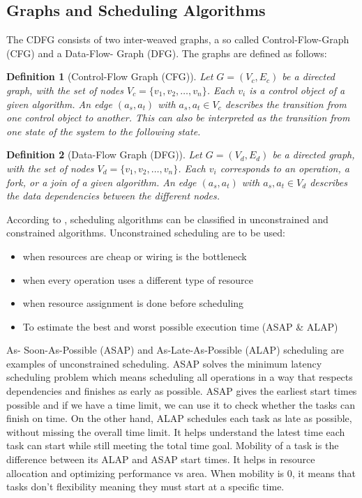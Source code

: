 \documentclass[conference]{IEEEtran}
\newtheorem{definition}{Definition}
\begin{document}
\subsection{Graphs and Scheduling Algorithms}
\label{subsec: power}
The CDFG consists of two inter-weaved graphs, a so called Control-Flow-Graph (CFG) and a Data-Flow-
Graph (DFG). The graphs are defined as follows:
\begin{definition}[Control-Flow Graph (CFG)]
\label{def:cfg}
Let $G = (V_c, E_c)$ be a directed graph, with the set of nodes $V_c = \{v_1, v_2, \ldots, v_n\}$. Each $v_i$ is a control object of a given algorithm. An edge $(a_s, a_t)$ with $a_s, a_t \in V_c$ describes the transition from one control object to another. This can also be interpreted as the transition from one state of the system to the following state.
\end{definition}

\begin{definition}[Data-Flow Graph (DFG)]
\label{def:dfg}
Let $G = (V_d, E_d)$ be a directed graph, with the set of nodes $V_d = \{v_1, v_2, \ldots, v_n\}$. Each $v_i$ corresponds to an operation, a fork, or a join of a given algorithm. An edge $(a_s, a_t)$ with $a_s, a_t \in V_d$ describes the data dependencies between the different nodes.
\end{definition}

According to \cite{Saraju01}, scheduling algorithms can be classified in unconstrained and constrained algorithms. Unconstrained scheduling are to be used: 
\begin{itemize}
    \item when resources are cheap or wiring is the bottleneck
    \item when every operation uses a different type of resource
    \item when resource assignment is done before scheduling
    \item To estimate the best and worst possible execution time (ASAP \& ALAP)
    
\end{itemize}
As- Soon-As-Possible (ASAP) and As-Late-As-Possible (ALAP) scheduling are examples of unconstrained scheduling. ASAP solves the minimum latency scheduling problem which means scheduling all operations in a way that respects dependencies and finishes as early as possible. ASAP gives the earliest start times possible and if we have a time limit, we can use it to check whether the tasks can finish on time. On the other hand, ALAP schedules each task as late as possible, without missing the overall time limit. It helps understand the latest time each task can start while still meeting the total time goal. Mobility of a task is the difference between its ALAP and ASAP start times. It helps in resource allocation and optimizing performance vs area. When mobility is 0, it means that tasks don't flexibility meaning they must start at a specific time. 
\end{document}
